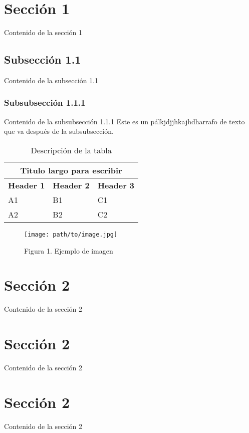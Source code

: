\section{Sección 1}
Contenido de la sección 1
\subsection{Subsección 1.1}
Contenido de la subsección 1.1
\subsubsection{Subsubsección 1.1.1}
Contenido de la subsubsección 1.1.1
Este es un pálkjdjjhkajhdharrafo de texto que va después de la subsubsección.
\begin{table}[h]
\centering
\begin{tabularx}{\textwidth}{|X|X|X|}
\hline
\multicolumn{3}{|c|}{\textbf{Titulo largo para escribir}}\\\hline
\textbf{Header 1} & \textbf{Header 2} & \textbf{Header 3} \\ \hline
A1 & B1 & C1 \\ \hline
A2 & B2 & C2 \\ \hline
\end{tabularx}
\caption{Descripción de la tabla}
\end{table}
\begin{figure}[h!]
\centering
\texttt{[image: path/to/image.jpg]}
\caption{Figura 1. Ejemplo de imagen}
\end{figure}
\section{Sección 2}
Contenido de la sección 2
\section{Sección 2}
Contenido de la sección 2
\section{Sección 2}
Contenido de la sección 2


